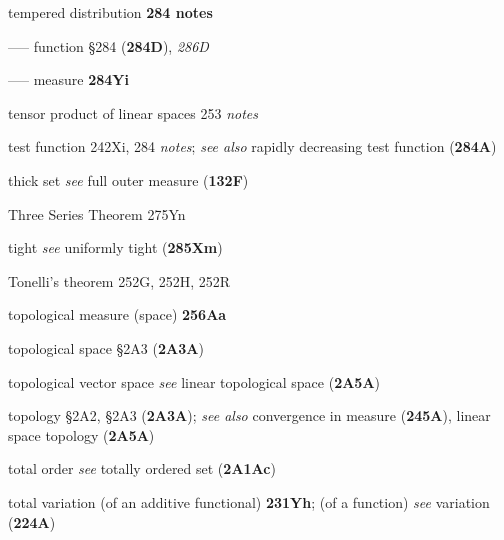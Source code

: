 tempered distribution {\bf 284 notes}


----- function \S284 ({\bf 284D}), {\it 286D}


----- measure {\bf 284Yi}


tensor product of linear spaces 253 {\it notes}




test function 242Xi, 284 {\it notes\/};
  {\it see also} rapidly decreasing test function ({\bf 284A})




thick set {\it see} full outer measure ({\bf 132F})




Three Series Theorem 275Yn






{tight {\it see} uniformly tight ({\bf 285Xm})}

























Tonelli's theorem 252G, 252H, 252R




topological measure (space) {\bf 256Aa}





topological space \S2A3 ({\bf 2A3A})


topological vector space {\it see} linear topological space
({\bf 2A5A})


topology \S2A2, \S2A3 ({\bf 2A3A}); 
  {\it see also} convergence in measure ({\bf 245A}),
linear space topology ({\bf 2A5A})





total order
  {\it see} totally ordered set ({\bf 2A1Ac})


total variation (of an additive functional) {\bf 231Yh};
(of a function) {\it see} variation ({\bf 224A})







